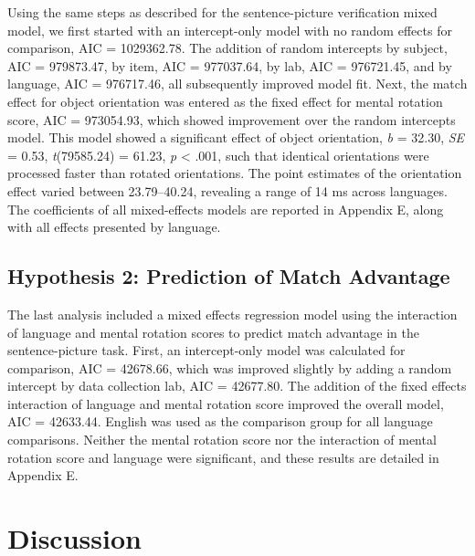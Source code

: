 \documentclass[
  man,floatsintext]{apa7}
\begin{document}
Using the same steps as described for the sentence-picture verification
mixed model, we first started with an intercept-only model with no
random effects for comparison, AIC =
1029362.78. The
addition of random intercepts by subject, AIC =
979873.47, by item,
AIC = 977037.64, by
lab, AIC = 976721.45,
and by language, AIC =
976717.46, all
subsequently improved model fit. Next, the match effect for object
orientation was entered as the fixed effect for mental rotation score,
AIC = 973054.93,
which showed improvement over the random intercepts model. This model
showed a significant effect of object orientation, \emph{b} =
32.30, \emph{SE} =
0.53,
\emph{t}(79585.24) =
61.23, \emph{p}
\textless{} .001, such that identical orientations were
processed faster than rotated orientations. The point estimates of the
orientation effect varied between 23.79--40.24, revealing a range of 14
ms across languages. The coefficients of all mixed-effects models are
reported in Appendix E, along with all effects presented by language.

\hypertarget{hypothesis-2-prediction-of-match-advantage}{%
\subsection{Hypothesis 2: Prediction of Match Advantage}\label{hypothesis-2-prediction-of-match-advantage}}

The last analysis included a mixed effects regression model using the
interaction of language and mental rotation scores to predict match
advantage in the sentence-picture task. First, an intercept-only model
was calculated for comparison, AIC =
42678.66, which
was improved slightly by adding a random intercept by data collection
lab, AIC = 42677.80. The
addition of the fixed effects interaction of language and mental
rotation score improved the overall model, AIC =
42633.44. English
was used as the comparison group for all language comparisons. Neither
the mental rotation score nor the interaction of mental rotation score
and language were significant, and these results are detailed in
Appendix E.

\hypertarget{discussion}{%
\section{Discussion}\label{discussion}}
\end{document}

